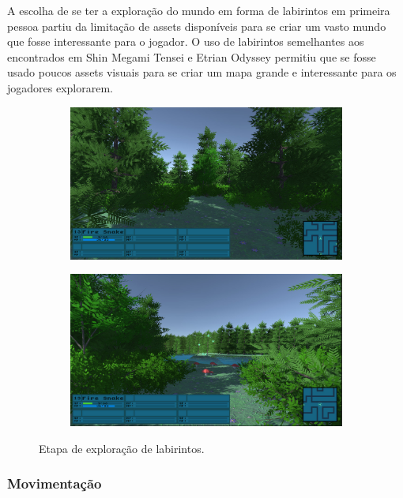 \documentclass[
	12pt,				%
	openright,			%
	twoside,			%
	a4paper,			%
	english,			%
	french,				%
	spanish,			%
	brazil				%
	]{abntex2}
\begin{document}
A escolha de se ter a exploração do mundo em forma de labirintos em primeira pessoa partiu da limitação de assets disponíveis para se criar um vasto mundo que fosse interessante para o jogador. O uso de labirintos semelhantes aos encontrados em Shin Megami Tensei e Etrian Odyssey permitiu que se fosse usado poucos assets visuais para se criar um mapa grande e interessante para os jogadores explorarem.

\begin{figure}[h!]
  \centering
  \begin{subfigure}[b]{0.4\linewidth}
    \includegraphics[width=\linewidth]{lab1.jpg}
  \end{subfigure}
  \begin{subfigure}[b]{0.4\linewidth}
    \includegraphics[width=\linewidth]{lab2.jpg}
  \end{subfigure}
  \caption{Etapa de exploração de labirintos.}
  \label{fig:jogo1}
\end{figure}

\subsubsection{Movimentação}
\end{document}
